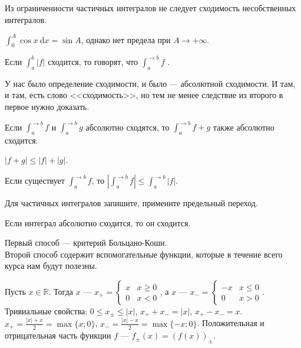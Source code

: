\documentclass{article}
\begin{document}
    \begin{itemize}
        \thm Из ограниченности частичных интегралов не следует сходимость несобственных интегралов.
        \begin{Proof}
            $\int_0^A\cos x~\mathrm dx=\sin A$, однако нет предела при $A\to+\infty$.
        \end{Proof}
        \dfn Если $\int_a^b|f|$ сходится, то говорят, что $\int_a^{\to b}f$ .
        \begin{Comment}
            У нас было определение сходимости, и было --- абсолютной сходимости. И там, и там, есть слово <<сходимость>>, но тем не менее следствие из второго в первое нужно доказать.
        \end{Comment}
        \thm Если $\int_a^{\to b}f$ и $\int_a^{\to b}g$ абсолютно сходятся, то $\int_a^{\to b}f+g$ также абсолютно сходится.
        \begin{Proof}
            $|f+g|\leqslant|f|+|g|$.
        \end{Proof}
        \thm Если существует $\int_a^{\to b}f$, то $\left|\int_a^{\to b}f\right|\leqslant\int_a^{\to b}|f|$.
        \begin{Proof}
            Для частичных интегралов запишите, примените предельный переход.
        \end{Proof}
        \thm Если интеграл абсолютно сходится, то он сходится.
        \begin{Proof}
            Первый способ --- критерий Больцано-Коши.\\
            Второй способ содержит вспомогательные функции, которые в течение всего курса нам будут полезны.
        \end{Proof}
        \dfn Пусть $x\in\mathbb R$. Тогда  $x$ --- $x_+=\begin{cases}
            x & x\geqslant0\\
            0 & x<0
        \end{cases}$, а  $x$ --- $x_-=\begin{cases}
            -x & x\leqslant0\\
            0 & x>0
        \end{cases}$.
        \thm Тривиальные свойства: $0\leqslant x_\pm\leqslant|x|$, $x_++x_-=|x|$, $x_+-x_-=x$.
        \thm $x_+=\frac{|x|+x}2=\max\{x;0\}$, $x_-=\frac{|x|-x}2=\max\{-x;0\}$.
        \dfn Положительная и отрицательная часть функции $f$ --- $f_\pm(x)=(f(x))_\pm$.
        \begin{Proof}

\end{Proof}
\end{itemize}
\end{document}
